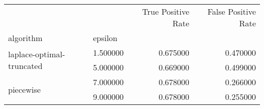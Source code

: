 \begin{tabular}{llrr}
\toprule
 &  & True Positive Rate & False Positive Rate \\
algorithm & epsilon &  &  \\
\midrule
\multirow[t]{2}{*}{laplace-optimal-truncated} & 1.500000 & 0.675000 & 0.470000 \\
 & 5.000000 & 0.669000 & 0.499000 \\
\cline{1-4}
\multirow[t]{2}{*}{piecewise} & 7.000000 & 0.678000 & 0.266000 \\
 & 9.000000 & 0.678000 & 0.255000 \\
\cline{1-4}
\bottomrule
\end{tabular}

